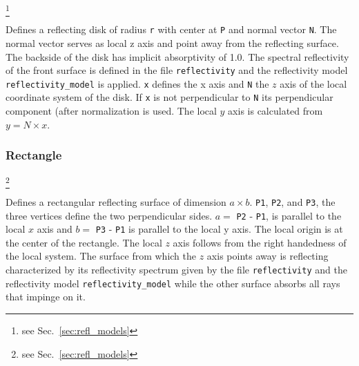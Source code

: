 \documentclass[10pt,a4paper,titlepage]{article}
\begin{document}


\footnote{see Sec.~\ref{sec:refl_models}}

\vspace{0.25cm}
Defines a reflecting disk of radius {\tt r} with center at {\tt P} and normal vector {\tt N}. The normal vector serves as local z axis and point away from the reflecting surface. The backside of the disk has implicit absorptivity of 1.0. The spectral reflectivity of the front surface is defined in the file {\tt reflectivity} and the reflectivity model {\tt reflectivity\_model} is applied. {\tt x} defines the x axis and {\tt N} the $z$ axis of the local coordinate system of the disk. If {\tt x} is not perpendicular to {\tt N} its perpendicular component (after normalization is used. The local $y$ axis is calculated from $y = N \times x$.

\subsubsection{Rectangle}







\footnote{see Sec.~\ref{sec:refl_models}}

\vspace{0.25cm}
Defines a rectangular reflecting surface of dimension $a \times b$. {\tt P1}, {\tt P2}, and {\tt P3}, the three vertices define the two perpendicular sides. $a=$ {\tt P2} - {\tt P1}, is parallel to the local $x$ axis and $b=$ {\tt P3} - {\tt P1} is parallel to the local y axis. The local origin is at the center of the rectangle. The local $z$ axis follows from the right handedness of the local system. The surface from which the $z$ axis points away is reflecting characterized by its reflectivity spectrum given by the file {\tt reflectivity} and the reflectivity model {\tt reflectivity\_model} while the other surface absorbs all rays that impinge on it.
\end{document}
